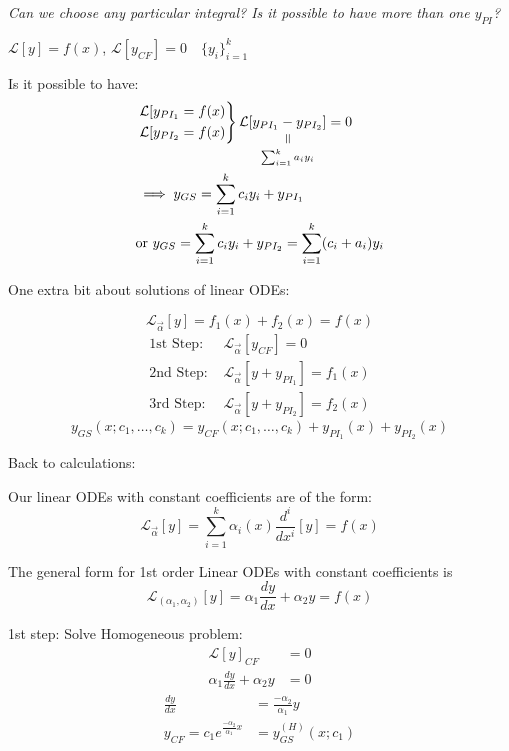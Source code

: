 \documentclass[twoside]{scrartcl}
\begin{document}
\emph{Can we choose any particular integral? Is it possible to have more than one $y_{PI}$?}

$\mathcal{L}[y] = f(x)$, $\mathcal{L}[y_{CF}] = 0 \quad \{y_i\}_{i=1}^k$

Is it possible to have: 
\[
\begin{aligned}
  &\begin{rcases*}
  \mathcal{L}[y_{PI_1} = f(x)\\
  \mathcal{L}[y_{PI_2} = f(x)	
  \end{rcases*}
  \mathcal{L}\equalto{[y_{PI_1} - y_{PI_2}]}{\sum_{i=1}^ka_iy_i} = 0\\
  &\implies y_{GS} = \sum_{i=1}^kc_iy_i + y_{PI_1}\\
  &\text{or }y_{GS} = \sum_{i=1}^kc_iy_i + y_{PI_2} = \sum_{i=1}^k(c_i+a_i)y_i
\end{aligned}
\]

One extra bit about solutions of linear ODEs:

\[\mathcal{L}_{\vec{\alpha}}[y] = f_1(x) + f_2(x) = f(x)\]
\[
\begin{aligned}
  \mbox{1st Step: }& \mathcal{L}_{\vec{\alpha}}[y_{CF}] = 0\\
  \mbox{2nd Step: }& \mathcal{L}_{\vec{\alpha}}[y+{y_{PI_1}}] = f_1(x)\\
  \mbox{3rd Step: }& \mathcal{L}_{\vec{\alpha}}[y+{y_{PI_2}}] = f_2(x)
\end{aligned}
\]
\[y_{GS}(x;c_1,\dots,c_k) = y_{CF}(x;c_1,\dots,c_k) + y_{PI_1}(x) + y_{PI_2}(x)\]

Back to calculations: 

Our linear ODEs with constant coefficients are of the form:
\[\mathcal{L}_{\vec{\alpha}}[y] = \sum_{i=1}^k\alpha_i(x)\frac{d^i}{dx^i}[y] = f(x)\]\vspace*{5pt}

The general form for 1st order Linear ODEs with constant coefficients is
\[\mathcal{L}_{(\alpha_1,\alpha_2)}[y] = \alpha_1\frac{dy}{dx} + \alpha_2y = f(x)\]

1st step: Solve Homogeneous problem:
\[
\begin{aligned}
  \mathcal{L}[y]_{CF} &= 0\\
  \alpha_1\frac{dy}{dx} + \alpha_2y &= 0
  \end{aligned}\]
\[\begin{aligned}
  \frac{dy}{dx} &= \frac{-\alpha_2}{\alpha_1}y\\
  y_{CF} = c_1e^{\frac{-\alpha_2}{\alpha_1}x} &= y_{GS}^{(H)}(x;c_1)
\end{aligned}
\]
\end{document}
